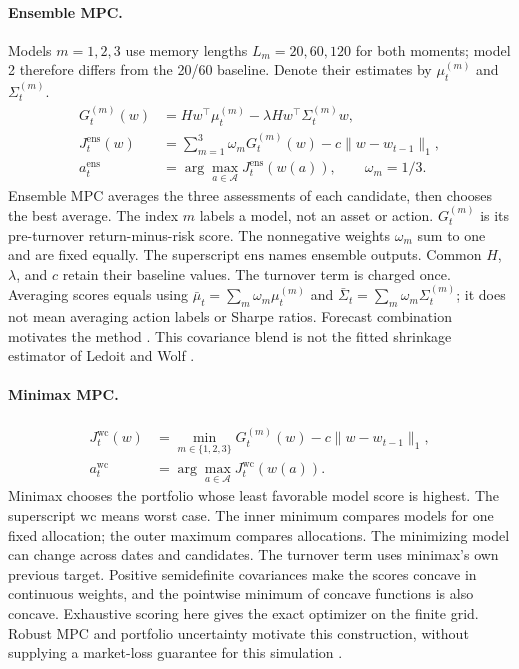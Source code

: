\paragraph{Ensemble MPC.}
Models $m=1,2,3$ use memory lengths $L_m=20,60,120$ for both moments; model 2 therefore differs from the 20/60 baseline. Denote their estimates by $\mu_t^{(m)}$ and $\Sigma_t^{(m)}$.
\begin{equation}
\begin{aligned}
G_t^{(m)}(w)&=Hw^\top\mu_t^{(m)}-\lambda H w^\top\Sigma_t^{(m)}w,\\
J_t^{\mathrm{ens}}(w)&=\sum_{m=1}^{3}\omega_mG_t^{(m)}(w)-c\|w-w_{t-1}\|_1,\\
a_t^{\mathrm{ens}}&=\arg\max_{a\in\mathcal A}J_t^{\mathrm{ens}}(w(a)),
\qquad \omega_m=1/3.
\end{aligned}
\label{eq:mpc-ensemble-detailed}
\end{equation}
Ensemble MPC averages the three assessments of each candidate, then chooses the best average.
The index $m$ labels a model, not an asset or action. $G_t^{(m)}$ is its pre-turnover return-minus-risk score. The nonnegative weights $\omega_m$ sum to one and are fixed equally. The superscript $\mathrm{ens}$ names ensemble outputs. Common $H$, $\lambda$, and $c$ retain their baseline values. The turnover term is charged once. Averaging scores equals using $\bar\mu_t=\sum_m\omega_m\mu_t^{(m)}$ and $\bar\Sigma_t=\sum_m\omega_m\Sigma_t^{(m)}$; it does not mean averaging action labels or Sharpe ratios. Forecast combination motivates the method \cite{bates1969combination,timmermann2006forecast}. This covariance blend is not the fitted shrinkage estimator of Ledoit and Wolf \cite{ledoit2004honey}.

\paragraph{Minimax MPC.}
\begin{equation}
\begin{aligned}
J_t^{\mathrm{wc}}(w)&=\min_{m\in\{1,2,3\}}G_t^{(m)}(w)-c\|w-w_{t-1}\|_1,\\
a_t^{\mathrm{wc}}&=\arg\max_{a\in\mathcal A}J_t^{\mathrm{wc}}(w(a)).
\end{aligned}
\label{eq:mpc-minimax-detailed}
\end{equation}
Minimax chooses the portfolio whose least favorable model score is highest.
The superscript $\mathrm{wc}$ means worst case. The inner minimum compares models for one fixed allocation; the outer maximum compares allocations. The minimizing model can change across dates and candidates. The turnover term uses minimax's own previous target. Positive semidefinite covariances make the scores concave in continuous weights, and the pointwise minimum of concave functions is also concave. Exhaustive scoring here gives the exact optimizer on the finite grid. Robust MPC and portfolio uncertainty motivate this construction, without supplying a market-loss guarantee for this simulation \cite{mayne2000constrained,lobo2000worstcase,wang2004robust}.
